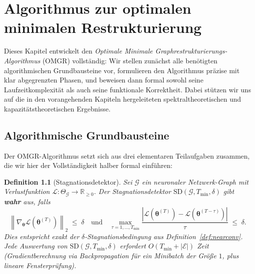 \documentclass[12pt, a4paper, openany]{report}
\newtheorem{definition}[theorem]{Definition}
\newcommand{\R}{\mathbb{R}}
\newcommand{\calG}{\mathcal{G}}
\newcommand{\calL}{\mathcal{L}}
\newcommand{\calE}{\mathcal{E}}
\newcommand{\norms}[1]{\left\|#1\right\|}
\newcommand{\abs}[1]{\left|#1\right|}
\begin{document}
\chapter{Algorithmus zur optimalen minimalen Restrukturierung}
\label{sec:algorithm}

Dieses Kapitel entwickelt den \emph{Optimale Minimale Graphrestrukturierungs-Algorithmus}
(OMGR) vollständig: Wir stellen zunächst alle benötigten algorithmischen
Grundbausteine vor, formulieren den Algorithmus präzise mit klar abgegrenzten
Phasen, und beweisen dann formal sowohl seine Laufzeitkomplexität als auch
seine funktionale Korrektheit.  Dabei stützen wir uns auf die in den vorangehenden
Kapiteln hergeleiteten spektraltheoretischen und kapazitätstheoretischen
Ergebnisse.

\section{Algorithmische Grundbausteine}
\label{sec:algo_building_blocks}

Der OMGR-Algorithmus setzt sich aus drei elementaren Teilaufgaben zusammen,
die wir hier der Vollständigkeit halber formal einführen:

\begin{definition}[Stagnationsdetektor]
\label{def:stagnation_detector}
Sei $\calG$ ein neuronaler Netzwerk-Graph mit Verlustfunktion
$\calL : \Theta_{\calG} \to \R_{\geq 0}$.  Der \emph{Stagnationsdetektor}
$\mathrm{SD}(\calG, T_{\min}, \delta)$ gibt \textbf{wahr} aus, falls
\begin{equation}
  \label{eq:sd_condition}
  \norms{\nabla_{\bm{\theta}} \calL(\bm{\theta}^{(T)})}_2 \;\leq\; \delta
  \quad\text{und}\quad
  \max_{\tau=1,\ldots,T_{\min}}
  \frac{\abs{\calL(\bm{\theta}^{(T)}) - \calL(\bm{\theta}^{(T-\tau)})}}{\tau}
  \;\leq\; \delta.
\end{equation}
Dies entspricht exakt der $\delta$-Stagnationsbedingung aus
Definition~\ref{def:nearconv}.  Jede Auswertung von
$\mathrm{SD}(\calG, T_{\min}, \delta)$ erfordert
$O(T_{\min} + |\calE|)$ Zeit (Gradientberechnung via Backpropagation
für ein Minibatch der Größe $1$, plus lineare Fensterprüfung).
\end{definition}
\end{document}
